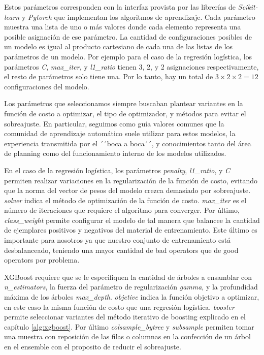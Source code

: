 Estos parámetros corresponden con la interfaz provista por las librerías de
\emph{Scikit-learn} y \emph{Pytorch} que implementan los algoritmos de
aprendizaje. Cada parámetro muestra una lista de uno o más valores donde cada
elemento representa una posible asignación de ese parámetro. La cantidad de
configuraciones posibles de un modelo es igual al producto cartesiano de cada
una de las listas de los parámetros de un modelo. Por ejemplo para el caso de la
regresión logística, los parámetros \emph{C}, \emph{max\_iter}, y
\emph{l1\_ratio} tienen 3, 2, y 2 asignaciones respectivamente, el resto de
parámetros solo tiene una. Por lo tanto, hay un total de $3 \times 2 \times 2 =
12$ configuraciones del modelo.

Los parámetros que seleccionamos siempre buscaban plantear variantes en la
función de costo a optimizar, el tipo de optimizador, y métodos para evitar el
sobreajuste. En particular, seguimos como guía valores comunes que la comunidad
de aprendizaje automático suele utilizar para estos modelos,  la experiencia
transmitida por el ´´boca a boca´´, y conocimientos tanto del área de planning
como del funcionamiento interno de los modelos utilizados. 

En el caso de la regresión logística, los parámetros \emph{penalty},
\emph{l1\_ratio}, y \emph{C} permiten realizar variaciones en la regularización
de la función de costo, evitando que la norma del vector de pesos del modelo
crezca demasiado por sobreajuste. \emph{solver} indica el método de optimización
de la función de costo. \emph{max\_iter} es el número de iteraciones que
requiere el algoritmo para converger. Por último, \emph{class\_weight} permite
configurar el modelo de tal manera que balancee la cantidad de ejemplares
positivos y negativos del material de entrenamiento. Este último es importante
para nosotros ya que nuestro conjunto de entrenamiento está desbalanceado,
teniendo una mayor cantidad de bad operators que de good operators por problema.

XGBoost requiere que se le especifiquen la cantidad de árboles a ensamblar con
\emph{n\_estimators}, la fuerza del parámetro de regularización \emph{gamma}, y
la profundidad máxima de los árboles \emph{max\_depth}. \emph{objetive} indica
la función objetivo a optimizar, en este caso la misma función de costo que una
regresión logística. \emph{booster} permite seleccionar variantes del método
iterativo de boosting explicado en el capítulo \ref{alg:xgboost}. Por último
\emph{colsample\_bytree} y \emph{subsample} permiten tomar una muestra con
reposición de las filas o columnas en la confección de un árbol en el ensemble
con el proposito de reducir el sobreajuste.

